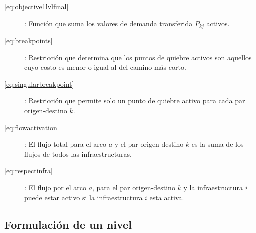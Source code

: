 \documentclass{article}
\begin{document}
  \begin{description}
    \item[\ref{eq:objective1lvlfinal}]: Función que suma los valores de demanda transferida $P_{kj}$ activos.
    \item[\ref{eq:breakpoints}]: Restricción que determina que los puntos de quiebre activos son aquellos cuyo costo es menor o igual al del camino más corto.
    \item[\ref{eq:singularbreakpoint}]: Restricción que permite solo un punto de quiebre activo para cada par origen-destino $k$.
    \item[\ref{eq:flowactivation}]: El flujo total para el arco $a$ y el par origen-destino $k$ es la suma de los flujos de todos las infraestructuras.
    \item[\ref{eq:respectinfra}]: El flujo por el arco $a$, para el par origen-destino $k$ y la infraestructura $i$ puede estar activo si la infraestructura $i$ esta activa.  
  \end{description}

  \subsection*{Formulación de un nivel}
\end{document}

